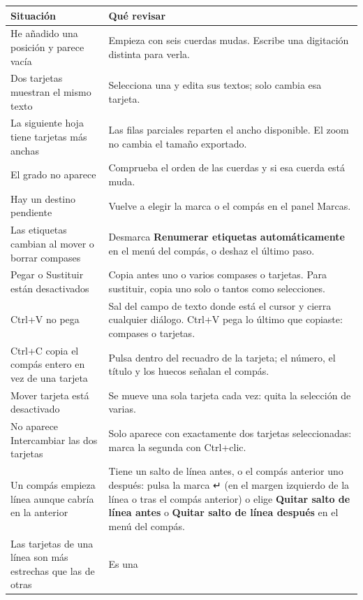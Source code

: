 \documentclass[a4paper,11pt]{article}
\newcounter{none}
\begin{document}
{\def\LTcaptype{none} %
\begin{longtable}[]{@{}>{\raggedright\arraybackslash}p{}>{\raggedright\arraybackslash}p{}@{}}
\toprule\noalign{}
Situación & Qué revisar \\
\midrule\noalign{}
\endhead
\bottomrule\noalign{}
\endlastfoot
He añadido una posición y parece vacía & Empieza con seis cuerdas mudas.
Escribe una digitación distinta para verla. \\
Dos tarjetas muestran el mismo texto & Selecciona una y edita sus
textos; solo cambia esa tarjeta. \\
La siguiente hoja tiene tarjetas más anchas & Las filas parciales
reparten el ancho disponible. El zoom no cambia el tamaño exportado. \\
El grado no aparece & Comprueba el orden de las cuerdas y si esa cuerda
está muda. \\
Hay un destino pendiente & Vuelve a elegir la marca o el compás en el
panel Marcas. \\
Las etiquetas cambian al mover o borrar compases & Desmarca
\textbf{Renumerar etiquetas automáticamente} en el menú del compás, o
deshaz el último paso. \\
Pegar o Sustituir están desactivados & Copia antes uno o varios compases
o tarjetas. Para sustituir, copia uno solo o tantos como selecciones. \\
Ctrl+V no pega & Sal del campo de texto donde está el cursor y cierra
cualquier diálogo. Ctrl+V pega lo último que copiaste: compases o
tarjetas. \\
Ctrl+C copia el compás entero en vez de una tarjeta & Pulsa dentro del
recuadro de la tarjeta; el número, el título y los huecos señalan el
compás. \\
Mover tarjeta está desactivado & Se mueve una sola tarjeta cada vez:
quita la selección de varias. \\
No aparece Intercambiar las dos tarjetas & Solo aparece con exactamente
dos tarjetas seleccionadas: marca la segunda con Ctrl+clic. \\
Un compás empieza línea aunque cabría en la anterior & Tiene un salto de
línea antes, o el compás anterior uno después: pulsa la marca ↵ (en el
margen izquierdo de la línea o tras el compás anterior) o elige
\textbf{Quitar salto de línea antes} o \textbf{Quitar salto de línea
después} en el menú del compás. \\
Las tarjetas de una línea son más estrechas que las de otras & Es una

\end{longtable}}
\end{document}
